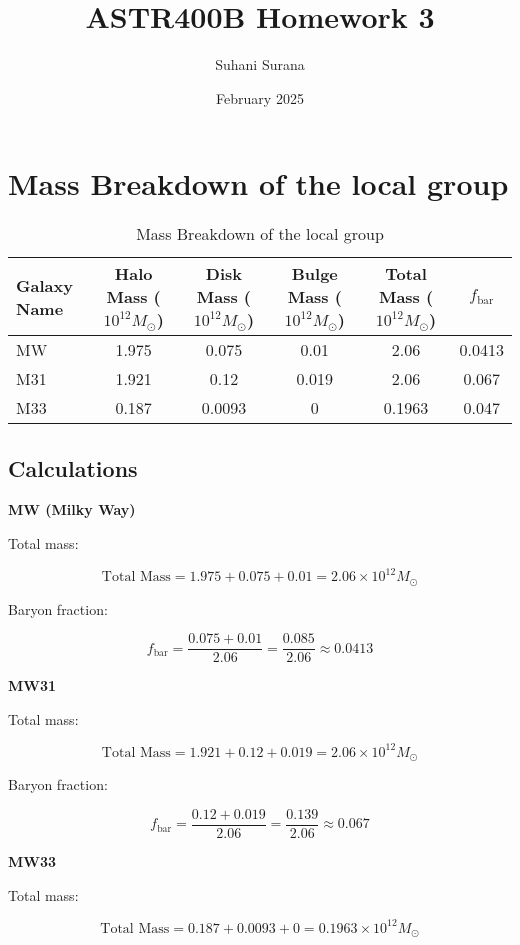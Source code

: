 \documentclass{article}
\title{ASTR400B Homework 3}
\author{Suhani Surana}
\date{February 2025}
\begin{document}
\maketitle


\section{Mass Breakdown of the local group}
\begin{table}[h]
    \centering
    \renewcommand{\arraystretch}{1.2} %
    \begin{tabular}{lccccc}
        \toprule
        Galaxy Name & Halo Mass ($10^{12} M_{\odot}$) & Disk Mass ($10^{12} M_{\odot}$) & Bulge Mass ($10^{12} M_{\odot}$) & Total Mass ($10^{12} M_{\odot}$) & $f_{\text{bar}}$ \\
        \midrule
        MW & 1.975 & 0.075 & 0.01 & 2.06 & 0.0413\\
        M31 & 1.921 & 0.12 & 0.019 & 2.06 & 0.067 \\
        M33 & 0.187 & 0.0093 & 0 &  0.1963  & 0.047 \\
        \bottomrule
    \end{tabular}
    \caption{Mass Breakdown of the local group}
    \label{tab:galaxy_masses}
\end{table}
\subsection{Calculations} 
\textbf{{MW (Milky Way)}}

Total mass:

\[
\text{Total Mass} = 1.975 + 0.075 + 0.01 = \boxed{2.06 \times 10^{12} M_{\odot}}
\]

Baryon fraction:

\[
f_{\text{bar}} = \frac{0.075 + 0.01}{2.06} = \frac{0.085}{2.06} \approx \boxed{0.0413}
\]

\textbf{{MW31}}

Total mass:

\[
\text{Total Mass} =  1.921 + 0.12 + 0.019 = \boxed{2.06 \times 10^{12} M_{\odot}}
\]

Baryon fraction:

\[
f_{\text{bar}} = \frac{0.12 + 0.019}{2.06} = \frac{0.139}{2.06} \approx \boxed{0.067}
\]

\textbf{{MW33}}

Total mass:

\[
\text{Total Mass} = 0.187 + 0.0093 + 0 = \boxed{0.1963\times 10^{12} M_{\odot}}
\]
\end{document}
